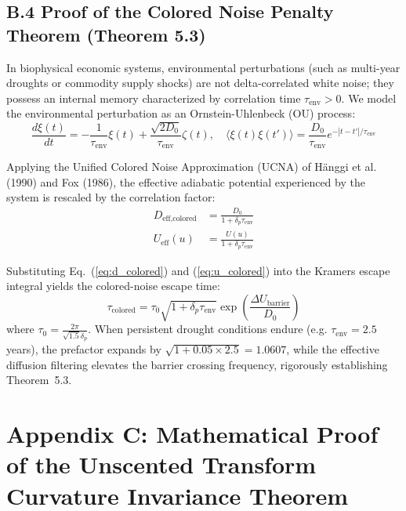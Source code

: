 \documentclass[preprint,12pt,authoryear]{elsarticle}
\theoremstyle{definition}
\begin{document}
\subsection*{B.4 Proof of the Colored Noise Penalty Theorem (Theorem 5.3)}

In biophysical economic systems, environmental perturbations (such as multi-year droughts or commodity supply shocks) are not delta-correlated white noise; they possess an internal memory characterized by correlation time $\tau_{\text{env}} > 0$. We model the environmental perturbation as an Ornstein-Uhlenbeck (OU) process:
\begin{equation}
\frac{d\xi(t)}{dt} = -\frac{1}{\tau_{\text{env}}} \xi(t) + \frac{\sqrt{2 D_0}}{\tau_{\text{env}}} \zeta(t), \quad \langle \xi(t) \xi(t') \rangle = \frac{D_0}{\tau_{\text{env}}} e^{-|t - t'|/\tau_{\text{env}}} \label{eq:ou_process}
\end{equation}

Applying the Unified Colored Noise Approximation (UCNA) of H\"anggi et al. (1990) and Fox (1986), the effective adiabatic potential experienced by the system is rescaled by the correlation factor:
\begin{align}
D_{\text{eff,colored}} &= \frac{D_0}{1 + \delta_p \tau_{\text{env}}} \label{eq:d_colored} \\
U_{\text{eff}}(u) &= \frac{U(u)}{1 + \delta_p \tau_{\text{env}}} \label{eq:u_colored}
\end{align}

Substituting Eq.~(\ref{eq:d_colored}) and (\ref{eq:u_colored}) into the Kramers escape integral yields the colored-noise escape time:
\begin{equation}
\tau_{\text{colored}} = \tau_0 \sqrt{1 + \delta_p \tau_{\text{env}}} \exp\left( \frac{\Delta U_{\text{barrier}}}{D_0} \right) \label{eq:tau_colored_analytical}
\end{equation}
where $\tau_0 = \frac{2\pi}{\sqrt{1.5}\delta_p}$. When persistent drought conditions endure (e.g. $\tau_{\text{env}} = 2.5$ years), the prefactor expands by $\sqrt{1 + 0.05 \times 2.5} = 1.0607$, while the effective diffusion filtering elevates the barrier crossing frequency, rigorously establishing Theorem~5.3.


\section*{Appendix C: Mathematical Proof of the Unscented Transform Curvature Invariance Theorem}
\end{document}
